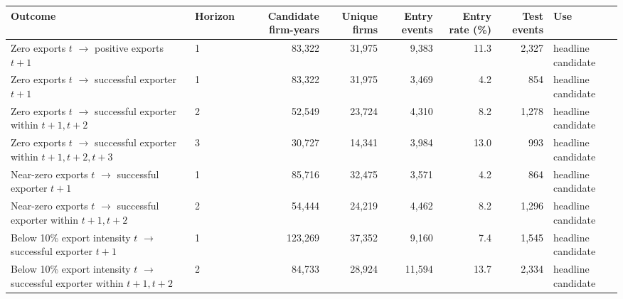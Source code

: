 \begin{table}[!ht]
 \label{tab:entry_outcomes_v2}
\centering
\begin{tabular}{llrrrrrl}
\hline
Outcome & Horizon & Candidate firm-years & Unique firms & Entry events & Entry rate (\%) & Test events & Use \\
\hline
Zero exports $t$ $\rightarrow$ positive exports $t+1$ & 1 & 83,322 & 31,975 & 9,383 & 11.3 & 2,327 & headline candidate \\
Zero exports $t$ $\rightarrow$ successful exporter $t+1$ & 1 & 83,322 & 31,975 & 3,469 & 4.2 & 854 & headline candidate \\
Zero exports $t$ $\rightarrow$ successful exporter within $t+1,t+2$ & 2 & 52,549 & 23,724 & 4,310 & 8.2 & 1,278 & headline candidate \\
Zero exports $t$ $\rightarrow$ successful exporter within $t+1,t+2,t+3$ & 3 & 30,727 & 14,341 & 3,984 & 13.0 & 993 & headline candidate \\
Near-zero exports $t$ $\rightarrow$ successful exporter $t+1$ & 1 & 85,716 & 32,475 & 3,571 & 4.2 & 864 & headline candidate \\
Near-zero exports $t$ $\rightarrow$ successful exporter within $t+1,t+2$ & 2 & 54,444 & 24,219 & 4,462 & 8.2 & 1,296 & headline candidate \\
Below 10\% export intensity $t$ $\rightarrow$ successful exporter $t+1$ & 1 & 123,269 & 37,352 & 9,160 & 7.4 & 1,545 & headline candidate \\
Below 10\% export intensity $t$ $\rightarrow$ successful exporter within $t+1,t+2$ & 2 & 84,733 & 28,924 & 11,594 & 13.7 & 2,334 & headline candidate \\
\hline
\end{tabular}
\end{table}

